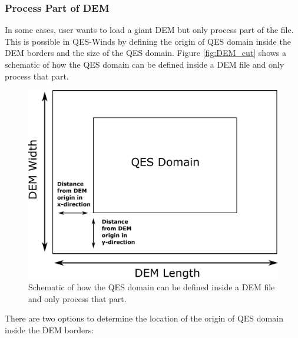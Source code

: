 \subsubsection{Process Part of DEM}

In some cases, user wants to load a giant DEM but only process part of the file. This is possible in QES-Winds by defining the origin of QES domain inside the DEM borders and the size of the QES domain. Figure \ref{fig:DEM_cut} shows a schematic of how the QES domain can be defined inside a DEM file and only process that part.

\begin{figure}[h!]
\centering
\includegraphics[width=13.0cm,keepaspectratio]{Images/DEM_cut.png}
\caption{Schematic of how the QES domain can be defined inside a DEM file and only process that part. }
\end{figure}

There are two options to determine the location of the origin of QES domain inside the DEM borders:

